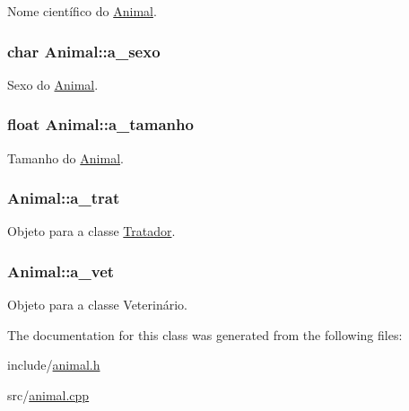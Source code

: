 Nome científico do \hyperlink{classAnimal}{Animal}. 

\subsubsection[{\texorpdfstring{a\+\_\+sexo}{a_sexo}}]{\setlength{\rightskip}{0pt plus 5cm}char Animal\+::a\+\_\+sexo\hspace{0.3cm}{\ttfamily [protected]}}\hypertarget{classAnimal_af2b1c520d145f82af7a5a88bb4271a0d}{}\label{classAnimal_af2b1c520d145f82af7a5a88bb4271a0d}


Sexo do \hyperlink{classAnimal}{Animal}. 

\subsubsection[{\texorpdfstring{a\+\_\+tamanho}{a_tamanho}}]{\setlength{\rightskip}{0pt plus 5cm}float Animal\+::a\+\_\+tamanho\hspace{0.3cm}{\ttfamily [protected]}}\hypertarget{classAnimal_a72366b060dfdbc0dd074fbe41decfcc2}{}\label{classAnimal_a72366b060dfdbc0dd074fbe41decfcc2}


Tamanho do \hyperlink{classAnimal}{Animal}. 

\subsubsection[{\texorpdfstring{a\+\_\+trat}{a_trat}}]{ Animal\+::a\+\_\+trat\hspace{0.3cm}{\ttfamily [protected]}}\hypertarget{classAnimal_a19fbf607b29b06a86f598dd1ffb8c712}{}\label{classAnimal_a19fbf607b29b06a86f598dd1ffb8c712}


Objeto para a classe \hyperlink{classTratador}{Tratador}. 

\subsubsection[{\texorpdfstring{a\+\_\+vet}{a_vet}}]{ Animal\+::a\+\_\+vet\hspace{0.3cm}{\ttfamily [protected]}}\hypertarget{classAnimal_a12ce5681957e27dae674cbbde7fb1e4f}{}\label{classAnimal_a12ce5681957e27dae674cbbde7fb1e4f}


Objeto para a classe Veterinário. 



The documentation for this class was generated from the following files\+:\begin{DoxyCompactItemize}
\item 
include/\hyperlink{animal_8h}{animal.\+h}\item 
src/\hyperlink{animal_8cpp}{animal.\+cpp}\end{DoxyCompactItemize}
